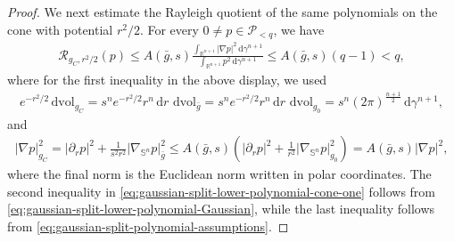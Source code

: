 \documentclass[11pt,reqno]{amsart}
\numberwithin{equation}{section}
\theoremstyle{definition}
\theoremstyle{remark}
\def\cP {\mathcal{P}}
\def\cR {\mathcal{R}}
\newcommand{\ud}{\mathrm{d}}
\newcommand{\0}{\emptyset}
\newcommand{\bbR}{\mathbb R}
\newcommand{\bbS}{\mathbb S}
\newcommand{\dvol}{\,\mathrm{dvol}}
\begin{document}
\begin{proof}
We next estimate the Rayleigh quotient of the same polynomials on the cone
with potential $r^2/2$. For every $0\neq p\in\cP_{<q}$, we have
\begin{align}\label{eq:gaussian-split-lower-polynomial-cone-one}
        \cR_{g_C,r^2/2}(p)
        \leq
        A(\bar g,s)
        \frac{
        \int_{\bbR^{n+1}}|\nabla p|^2\,\ud\gamma^{n+1}
        }{
        \int_{\bbR^{n+1}}p^2\,\ud\gamma^{n+1}
        }
        \leq
        A(\bar g,s)(q-1)
        <
        q,
\end{align}
where for the first inequality in the above display, we used
\begin{align}
        e^{-r^2/2}\dvol_{g_C}
        =
        s^ne^{-r^2/2}r^n\,\ud r\,\dvol_{\bar g}
        =
        s^ne^{-r^2/2}r^n\,\ud r\,\dvol_{g_0}
        =
        s^n(2\pi)^{\frac{n+1}{2}}\,\ud\gamma^{n+1},
\end{align}
and
\begin{align}
        |\nabla p|_{g_C}^2
        =
        |\partial_rp|^2
        +
        \frac1{s^2r^2}|\nabla_{\bbS^n}p|_{\bar g}^2
        \leq
        A(\bar g,s)
        \left(
        |\partial_rp|^2
        +
        \frac1{r^2}|\nabla_{\bbS^n}p|_{g_0}^2
        \right)
        =
        A(\bar g,s)|\nabla p|^2,
\end{align}
where the final norm is the Euclidean norm written in polar coordinates. The second inequality in \eqref{eq:gaussian-split-lower-polynomial-cone-one} follows from \eqref{eq:gaussian-split-lower-polynomial-Gaussian}, while the last inequality follows from \eqref{eq:gaussian-split-polynomial-assumptions}. 


\end{proof}
\end{document}
